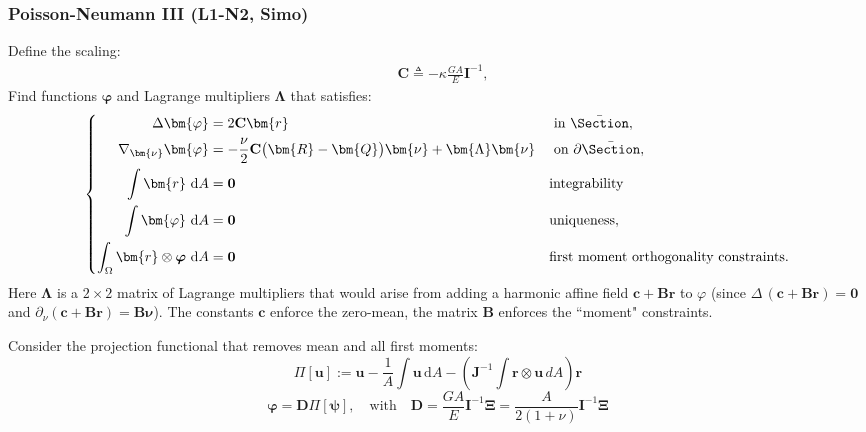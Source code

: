 \subsubsection{Poisson-Neumann III (L1-N2, Simo)}
Define the scaling:
\begin{equation*}
\begin{aligned}
&\mathbf{C} \triangleq -\kappa \frac{G A}{E} \mathbf{I}^{-1},
\end{aligned}
\end{equation*}
Find functions \(\bm{\varphi}\) and Lagrange multipliers \(\bm{\Lambda}\) that satisfies:
\begin{equation}
\left\{
\begin{aligned}
\Delta \bm{\varphi} & =2 \mathbf{C} \bm{r} & & \text { in } \bar{\Section}, \\
\nabla_{\bm{\nu}} \bm{\varphi} & =-\frac{\nu}{2} \mathbf{C}\bigl(\bm{R} - \bm{Q}\bigr) \bm{\nu} + \bm{\Lambda} \bm{\nu} & & \text { on } \partial \bar{\Section}, \\
\int \bm{r}\mathrm{~d}A &= \mathbf{0} & & \text{integrability} \\
\int \bm{\varphi}\mathrm{~d}A &= \mathbf{0} & & \text{uniqueness}, \\
\int_\Omega \bm{r}\otimes \boldsymbol{\varphi}\mathrm{~d}A&=\mathbf{0}  & & \text{first moment orthogonality constraints.}
\end{aligned}
\right.
\end{equation}
%
%
Here $\bm{\Lambda}$ is a ${2} \times {2}$ matrix of Lagrange multipliers that would arise from adding a harmonic affine field $\bm{c}+\mathbf{B} \bm{r}$ to $\varphi$ (since $\Delta\,(\bm{c}+\mathbf{B} \bm{r})=\mathbf{0}$ and $\partial_\nu(\bm{c}+\mathbf{B} \bm{r})=\mathbf{B} \bm{\nu}$). 
The constants $\bm{c}$ enforce the zero-mean, the matrix $\mathbf{B}$ enforces the ``moment" constraints.


Consider the projection functional that removes mean and all first moments:
\begin{equation}
\Pi[\bm{u}]:=\bm{u}-\frac{1}{A} \int \bm{u} \, \mathrm{d} A - \left(\mathbf{J}^{-1} \int \bm{r} \otimes \bm{u}\, d A\right) \bm{r}
\end{equation}
\begin{equation}
\bm{\varphi}=\mathbf{D} \Pi[\bm{\psi}], 
\quad\text{with}\quad
\mathbf{D}= \frac{GA}{E} \mathbf{I}^{-1}\bm{\Xi}= \frac{A}{2(1+\nu)} \mathbf{I}^{-1}\bm{\Xi}
\end{equation}

